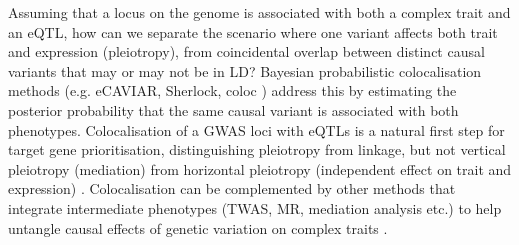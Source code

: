 \begin{outline}
Assuming that a locus on the genome is associated with both a complex trait and an \gls{eQTL},
how can we separate the scenario where one variant affects both trait and expression (pleiotropy),
from coincidental overlap between distinct causal variants that may or may not be in \gls{LD}?
Bayesian probabilistic colocalisation methods (e.g. eCAVIAR, Sherlock, coloc \autocite{wallace2020ElicitingPriorsRelaxing}) 
address this by estimating the posterior probability that the same causal variant is associated with both phenotypes.
Colocalisation of a \gls{GWAS} loci with \glspl{eQTL} is a natural first step for target gene prioritisation,
distinguishing pleiotropy from linkage, 
but not vertical pleiotropy (mediation) from horizontal pleiotropy (independent effect on trait and expression) \autocite{hemani2018EvaluatingPotentialRole}.
Colocalisation can be complemented by other methods that integrate intermediate phenotypes (TWAS, MR, mediation analysis etc.) to help untangle causal effects of genetic variation on complex traits \autocite{hemani2018EvaluatingPotentialRole}.
%
%
%
%

\end{outline}
